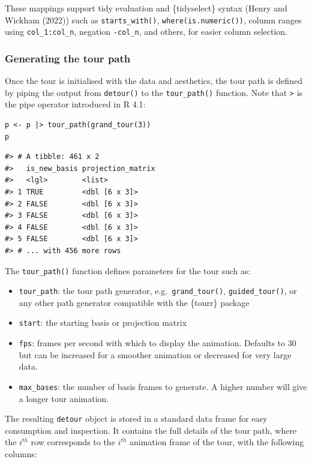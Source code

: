 These mappings support tidy evaluation and \{tidyselect\} syntax (Henry and Wickham (2022)) such as \texttt{starts\_with()}, \texttt{where(is.numeric())}, column ranges using \texttt{col\_1:col\_n}, negation \texttt{-col\_n}, and others, for easier column selection.

\hypertarget{generating-the-tour-path}{%
\subsubsection{Generating the tour path}\label{generating-the-tour-path}}

Once the tour is initialised with the data and aesthetics, the tour path is defined by piping the output from \texttt{detour()} to the \texttt{tour\_path()} function. Note that \texttt{\textbar{}\textgreater{}} is the pipe operator introduced in R 4.1:

\pagebreak

\begin{verbatim}
p <- p |> tour_path(grand_tour(3))
p
\end{verbatim}

\begin{verbatim}
#> # A tibble: 461 x 2
#>   is_new_basis projection_matrix
#>   <lgl>        <list>           
#> 1 TRUE         <dbl [6 x 3]>    
#> 2 FALSE        <dbl [6 x 3]>    
#> 3 FALSE        <dbl [6 x 3]>    
#> 4 FALSE        <dbl [6 x 3]>    
#> 5 FALSE        <dbl [6 x 3]>    
#> # ... with 456 more rows
\end{verbatim}

The \texttt{tour\_path()} function defines parameters for the tour such as:

\begin{itemize}
\tightlist
\item
  \texttt{tour\_path}: the tour path generator, e.g.~\texttt{grand\_tour()}, \texttt{guided\_tour()}, or any other path generator compatible with the \{tourr\} package
\item
  \texttt{start}: the starting basis or projection matrix
\item
  \texttt{fps}: frames per second with which to display the animation. Defaults to 30 but can be increased for a smoother animation or decreased for very large data.
\item
  \texttt{max\_bases}: the number of basis frames to generate. A higher number will give a longer tour animation.
\end{itemize}

The resulting \texttt{detour} object is stored in a standard data frame for easy consumption and inspection. It contains the full details of the tour path, where the \(i^{th}\) row corresponds to the \(i^{th}\) animation frame of the tour, with the following columns:

